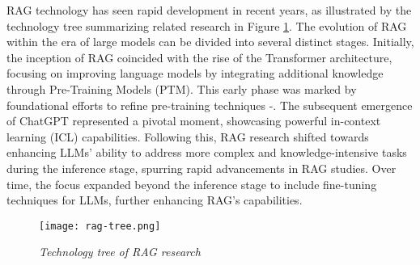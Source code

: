 RAG technology has seen rapid development in recent years, as illustrated by the technology tree summarizing related research in Figure \ref{fig:rag-tree}. The evolution of RAG within the era of large models can be divided into several distinct stages. Initially, the inception of RAG coincided with the rise of the Transformer architecture, focusing on improving language models by integrating additional knowledge through Pre-Training Models (PTM). This early phase was marked by foundational efforts to refine pre-training techniques \cite{arora2023garmeetsrag}-\cite{borgeaud2022improving}. The subsequent emergence of ChatGPT \cite{ouyang2022training} represented a pivotal moment, showcasing powerful in-context learning (ICL) capabilities. Following this, RAG research shifted towards enhancing LLMs' ability to address more complex and knowledge-intensive tasks during the inference stage, spurring rapid advancements in RAG studies. Over time, the focus expanded beyond the inference stage to include fine-tuning techniques for LLMs, further enhancing RAG's capabilities.

\begin{figure}[H]
    \centering
    \texttt{[image: rag-tree.png]}
    \caption{
        \it{ Technology tree of RAG research \cite{gao2024retrievalaugmented}}
    }
    \label{fig:rag-tree}
\end{figure}
